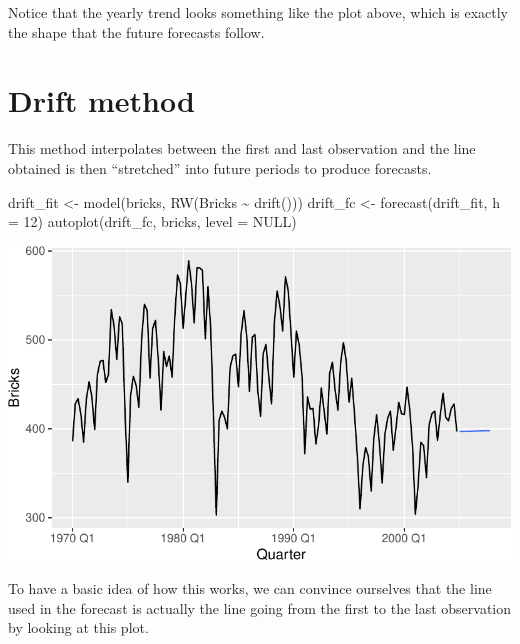\documentclass[
  letterpaper,
  DIV=11,
  numbers=noendperiod]{scrartcl}
\newenvironment{Shaded}{\begin{snugshade}}{\end{snugshade}}
\newcommand{\AttributeTok}[1]{\textcolor[rgb]{0.40,0.45,0.13}{#1}}
\newcommand{\ConstantTok}[1]{\textcolor[rgb]{0.56,0.35,0.01}{#1}}
\newcommand{\DecValTok}[1]{\textcolor[rgb]{0.68,0.00,0.00}{#1}}
\newcommand{\FunctionTok}[1]{\textcolor[rgb]{0.28,0.35,0.67}{#1}}
\newcommand{\NormalTok}[1]{\textcolor[rgb]{0.00,0.23,0.31}{#1}}
\newcommand{\OtherTok}[1]{\textcolor[rgb]{0.00,0.23,0.31}{#1}}
\newcommand{\SpecialCharTok}[1]{\textcolor[rgb]{0.37,0.37,0.37}{#1}}
\begin{document}
Notice that the yearly trend looks something like the plot above, which
is exactly the shape that the future forecasts follow.

\section{Drift method}\label{drift-method}

This method interpolates between the first and last observation and the
line obtained is then ``stretched'' into future periods to produce
forecasts.

\begin{Shaded}
\begin{Highlighting}[]
\NormalTok{drift\_fit }\OtherTok{\textless{}{-}} \FunctionTok{model}\NormalTok{(bricks, }\FunctionTok{RW}\NormalTok{(Bricks }\SpecialCharTok{\textasciitilde{}} \FunctionTok{drift}\NormalTok{()))}
\NormalTok{drift\_fc }\OtherTok{\textless{}{-}} \FunctionTok{forecast}\NormalTok{(drift\_fit, }\AttributeTok{h =} \DecValTok{12}\NormalTok{)}
\FunctionTok{autoplot}\NormalTok{(drift\_fc, bricks, }\AttributeTok{level =} \ConstantTok{NULL}\NormalTok{)}
\end{Highlighting}
\end{Shaded}

\begin{center}
\includegraphics{chapter5_review_files/figure-pdf/unnamed-chunk-18-1.pdf}
\end{center}

To have a basic idea of how this works, we can convince ourselves that
the line used in the forecast is actually the line going from the first
to the last observation by looking at this plot.
\end{document}
